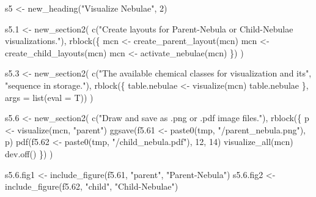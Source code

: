 \documentclass[
]{article}
\newenvironment{Shaded}{\begin{snugshade}}{\end{snugshade}}
\newcommand{\AttributeTok}[1]{\textcolor[rgb]{0.77,0.63,0.00}{#1}}
\newcommand{\DecValTok}[1]{\textcolor[rgb]{0.00,0.00,0.81}{#1}}
\newcommand{\FloatTok}[1]{\textcolor[rgb]{0.00,0.00,0.81}{#1}}
\newcommand{\FunctionTok}[1]{\textcolor[rgb]{0.00,0.00,0.00}{#1}}
\newcommand{\NormalTok}[1]{#1}
\newcommand{\OtherTok}[1]{\textcolor[rgb]{0.56,0.35,0.01}{#1}}
\newcommand{\StringTok}[1]{\textcolor[rgb]{0.31,0.60,0.02}{#1}}
\begin{document}
\begin{Shaded}
\begin{Highlighting}[]
\NormalTok{s5 }\OtherTok{\textless{}{-}} \FunctionTok{new\_heading}\NormalTok{(}\StringTok{"Visualize Nebulae"}\NormalTok{, }\DecValTok{2}\NormalTok{)}

\NormalTok{s5}\FloatTok{.1} \OtherTok{\textless{}{-}} \FunctionTok{new\_section2}\NormalTok{(}
  \FunctionTok{c}\NormalTok{(}\StringTok{"Create layouts for Parent{-}Nebula or Child{-}Nebulae visualizations."}\NormalTok{),}
  \FunctionTok{rblock}\NormalTok{(\{}
\NormalTok{    mcn }\OtherTok{\textless{}{-}} \FunctionTok{create\_parent\_layout}\NormalTok{(mcn)}
\NormalTok{    mcn }\OtherTok{\textless{}{-}} \FunctionTok{create\_child\_layouts}\NormalTok{(mcn)}
\NormalTok{    mcn }\OtherTok{\textless{}{-}} \FunctionTok{activate\_nebulae}\NormalTok{(mcn)}
\NormalTok{  \})}
\NormalTok{)}

\NormalTok{s5}\FloatTok{.3} \OtherTok{\textless{}{-}} \FunctionTok{new\_section2}\NormalTok{(}
  \FunctionTok{c}\NormalTok{(}\StringTok{"The available chemical classes for visualization and its"}\NormalTok{,}
    \StringTok{"sequence in storage."}\NormalTok{),}
  \FunctionTok{rblock}\NormalTok{(\{}
\NormalTok{    table.nebulae }\OtherTok{\textless{}{-}} \FunctionTok{visualize}\NormalTok{(mcn)}
\NormalTok{    table.nebulae}
\NormalTok{  \}, }\AttributeTok{args =} \FunctionTok{list}\NormalTok{(}\AttributeTok{eval =}\NormalTok{ T))}
\NormalTok{)}

\NormalTok{s5}\FloatTok{.6} \OtherTok{\textless{}{-}} \FunctionTok{new\_section2}\NormalTok{(}
  \FunctionTok{c}\NormalTok{(}\StringTok{"Draw and save as .png or .pdf image files."}\NormalTok{),}
  \FunctionTok{rblock}\NormalTok{(\{}
\NormalTok{    p }\OtherTok{\textless{}{-}} \FunctionTok{visualize}\NormalTok{(mcn, }\StringTok{"parent"}\NormalTok{)}
    \FunctionTok{ggsave}\NormalTok{(f5}\FloatTok{.61} \OtherTok{\textless{}{-}} \FunctionTok{paste0}\NormalTok{(tmp, }\StringTok{"/parent\_nebula.png"}\NormalTok{), p)}
    \FunctionTok{pdf}\NormalTok{(f5}\FloatTok{.62} \OtherTok{\textless{}{-}} \FunctionTok{paste0}\NormalTok{(tmp, }\StringTok{"/child\_nebula.pdf"}\NormalTok{), }\DecValTok{12}\NormalTok{, }\DecValTok{14}\NormalTok{)}
    \FunctionTok{visualize\_all}\NormalTok{(mcn)}
    \FunctionTok{dev.off}\NormalTok{()}
\NormalTok{  \})}
\NormalTok{)}

\NormalTok{s5.}\FloatTok{6.}\NormalTok{fig1 }\OtherTok{\textless{}{-}} \FunctionTok{include\_figure}\NormalTok{(f5}\FloatTok{.61}\NormalTok{, }\StringTok{"parent"}\NormalTok{, }\StringTok{"Parent{-}Nebula"}\NormalTok{)}
\NormalTok{s5.}\FloatTok{6.}\NormalTok{fig2 }\OtherTok{\textless{}{-}} \FunctionTok{include\_figure}\NormalTok{(f5}\FloatTok{.62}\NormalTok{, }\StringTok{"child"}\NormalTok{, }\StringTok{"Child{-}Nebulae"}\NormalTok{)}


\end{Highlighting}
\end{Shaded}
\end{document}
